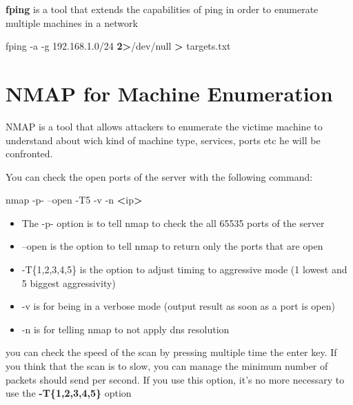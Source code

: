 \documentclass{assets/ipesethesis}
\newenvironment{Shaded}{\begin{snugshade}}{\end{snugshade}}
\newcommand{\ExtensionTok}[1]{#1}
\newcommand{\FunctionTok}[1]{\textcolor[rgb]{0.00,0.00,0.00}{#1}}
\newcommand{\NormalTok}[1]{#1}
\newcommand{\OperatorTok}[1]{\textcolor[rgb]{0.81,0.36,0.00}{\textbf{#1}}}
\providecommand{\tightlist}{%
  \setlength{\itemsep}{0pt}\setlength{\parskip}{0pt}}
\begin{document}
\textbf{fping} is a tool that extends the capabilities of ping in order to enumerate multiple machines in a network

\begin{Shaded}
\begin{Highlighting}[]
\ExtensionTok{fping}\NormalTok{ -a -g 192.168.1.0/24 }\OperatorTok{2>}\NormalTok{/dev/null }\OperatorTok{>}\NormalTok{ targets.txt}
\end{Highlighting}
\end{Shaded}

\hypertarget{nmap-for-machine-enumeration}{%
\section*{NMAP for Machine Enumeration}\label{nmap-for-machine-enumeration}}

NMAP is a tool that allows attackers to enumerate the victime machine to understand about wich kind of machine type, services, ports etc he will be confronted.

You can check the open ports of the server with the following command:

\begin{Shaded}
\begin{Highlighting}[]
\FunctionTok{nmap}\NormalTok{ -p- --open -T5 -v -n }\OperatorTok{<}\NormalTok{ip}\OperatorTok{>}
\end{Highlighting}
\end{Shaded}

\begin{itemize}
\tightlist
\item
  The -p- option is to tell nmap to check the all 65535 ports of the server
\item
  --open is the option to tell nmap to return only the ports that are open
\item
  -T\{1,2,3,4,5\} is the option to adjust timing to aggressive mode (1 lowest and 5 biggest aggressivity)
\item
  -v is for being in a verbose mode (output result as soon as a port is open)
\item
  -n is for telling nmap to not apply dns resolution
\end{itemize}

you can check the speed of the scan by pressing multiple time the enter key. If you think that the scan is to slow, you can manage the minimum number of packets should
send per second. If you use this option, it's no more necessary to use the \textbf{-T\{1,2,3,4,5\}} option
\end{document}
